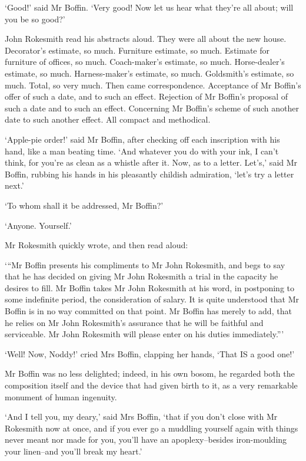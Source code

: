 ‘Good!’ said Mr Boffin. ‘Very good! Now let us hear what they’re all
about; will you be so good?’

John Rokesmith read his abstracts aloud. They were all about the new
house. Decorator’s estimate, so much. Furniture estimate, so much.
Estimate for furniture of offices, so much. Coach-maker’s estimate, so
much. Horse-dealer’s estimate, so much. Harness-maker’s estimate, so
much. Goldsmith’s estimate, so much. Total, so very much. Then came
correspondence. Acceptance of Mr Boffin’s offer of such a date, and to
such an effect. Rejection of Mr Boffin’s proposal of such a date and to
such an effect. Concerning Mr Boffin’s scheme of such another date to
such another effect. All compact and methodical.

‘Apple-pie order!’ said Mr Boffin, after checking off each inscription
with his hand, like a man beating time. ‘And whatever you do with your
ink, I can’t think, for you’re as clean as a whistle after it. Now, as
to a letter. Let’s,’ said Mr Boffin, rubbing his hands in his pleasantly
childish admiration, ‘let’s try a letter next.’

‘To whom shall it be addressed, Mr Boffin?’

‘Anyone. Yourself.’

Mr Rokesmith quickly wrote, and then read aloud:

‘“Mr Boffin presents his compliments to Mr John Rokesmith, and begs
to say that he has decided on giving Mr John Rokesmith a trial in the
capacity he desires to fill. Mr Boffin takes Mr John Rokesmith at his
word, in postponing to some indefinite period, the consideration of
salary. It is quite understood that Mr Boffin is in no way committed
on that point. Mr Boffin has merely to add, that he relies on Mr John
Rokesmith’s assurance that he will be faithful and serviceable. Mr John
Rokesmith will please enter on his duties immediately.”’

‘Well! Now, Noddy!’ cried Mrs Boffin, clapping her hands, ‘That IS a
good one!’

Mr Boffin was no less delighted; indeed, in his own bosom, he regarded
both the composition itself and the device that had given birth to it,
as a very remarkable monument of human ingenuity.

‘And I tell you, my deary,’ said Mrs Boffin, ‘that if you don’t close
with Mr Rokesmith now at once, and if you ever go a muddling yourself
again with things never meant nor made for you, you’ll have an
apoplexy--besides iron-moulding your linen--and you’ll break my heart.’

